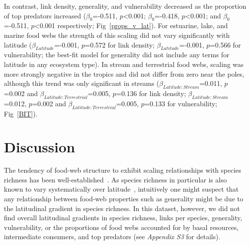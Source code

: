 \documentclass[12pt]{article}
\begin{document}
  In contrast, link density, generality, and vulnerability decreased as the
  proportion of top predators increased ($\beta_0$=-0.511, $p$\textless0.001;
  $\beta_0$=-0.418, $p$\textless0.001; and $\beta_0$=-0.511, $p$\textless0.001
  respectively; Fig~\ref{props_v_lat}). For estuarine, lake, and marine
  food webs the strength of this scaling did not
  vary significantly with latitude ($\beta_{Latitude}$=-0.001, $p$=0.572 for
  link density; $\beta_{Latitude}$=-0.001, $p$=0.566 for vulnerability; the
  best-fit model for generality did not include any terms for latitude in
  any ecosystem type). In stream and terrestrial food webs, scaling was more
  strongly negative in the tropics and did not differ from zero near the poles,
  although this trend was only significant in streams
  ($\beta_{Latitude:Stream}$=0.011, $p$=0.002 and
  $\beta_{Latitude:Terrestrial}$=0.005, $p$=0.136 for link density;
  $\beta_{Latitude:Stream}$=0.012, $p$=0.002 and
  $\beta_{Latitude:Terrestrial}$=0.005, $p$=0.133 for vulnerability; Fig~\ref{BIT}).



\section*{Discussion}

  The tendency of food-web structure to exhibit scaling relationships with
  species richness has been well-established~\citep{Dunne2004,Riede2010}. As
  species richness in particular is also known to vary systematically over
  latitude~\citep{Schemske2009,Macpherson2002,Kaufman1995}, intuitively one
  might suspect that any relationship between food-web properties such as
  generality might be due to the latitudinal gradient in species richness. In
  this dataset, however, we did not find overall latitudinal gradients in
  species richness, links per species,  generality, vulnerability, or the
  proportions of food webs accounted for by  basal resources, intermediate
  consumers, and top predators (see \emph{Appendix S3} for details).
\end{document}
